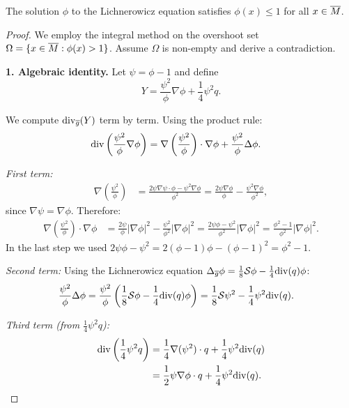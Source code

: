\begin{theorem}\label{thm:PhiBound}
The solution $\phi$ to the Lichnerowicz equation satisfies $\phi(x) \le 1$ for all $x \in \overline{M}$.
\end{theorem}
\begin{proof}
We employ the integral method on the overshoot set $\Omega = \{ x \in \overline{M} : \phi(x) > 1 \}$. Assume $\Omega$ is non-empty and derive a contradiction.

\textbf{1. Algebraic identity.}
Let $\psi = \phi-1$ and define
\[ Y = \frac{\psi^2}{\phi}\nabla \phi + \frac{1}{4}\psi^2 q. \]

We compute $\mathrm{div}_{\overline{g}}(Y)$ term by term. Using the product rule:
\begin{align*}
    \mathrm{div}\left(\frac{\psi^2}{\phi}\nabla \phi\right) &= \nabla\left(\frac{\psi^2}{\phi}\right) \cdot \nabla \phi + \frac{\psi^2}{\phi} \Delta \phi.
\end{align*}

\textit{First term:}
\begin{align*}
    \nabla\left(\frac{\psi^2}{\phi}\right) &= \frac{2\psi \nabla\psi \cdot \phi - \psi^2 \nabla\phi}{\phi^2} = \frac{2\psi \nabla\phi}{\phi} - \frac{\psi^2 \nabla\phi}{\phi^2},
\end{align*}
since $\nabla\psi = \nabla\phi$. Therefore:
\begin{align*}
    \nabla\left(\frac{\psi^2}{\phi}\right) \cdot \nabla\phi &= \frac{2\psi}{\phi}|\nabla\phi|^2 - \frac{\psi^2}{\phi^2}|\nabla\phi|^2 = \frac{2\psi\phi - \psi^2}{\phi^2}|\nabla\phi|^2 = \frac{\phi^2 - 1}{\phi^2}|\nabla\phi|^2.
\end{align*}
In the last step we used $2\psi\phi - \psi^2 = 2(\phi-1)\phi - (\phi-1)^2 = \phi^2 - 1$.

\textit{Second term:}
Using the Lichnerowicz equation $\Delta_{\overline{g}} \phi = \tfrac18 \mathcal{S}\phi - \tfrac14 \mathrm{div}(q)\phi$:
\begin{align*}
    \frac{\psi^2}{\phi}\Delta\phi &= \frac{\psi^2}{\phi}\left(\frac{1}{8}\mathcal{S}\phi - \frac{1}{4}\mathrm{div}(q)\phi\right) = \frac{1}{8}\mathcal{S}\psi^2 - \frac{1}{4}\psi^2\mathrm{div}(q).
\end{align*}

\textit{Third term (from $\frac{1}{4}\psi^2 q$):}
\begin{align*}
    \mathrm{div}\left(\frac{1}{4}\psi^2 q\right) &= \frac{1}{4}\nabla(\psi^2) \cdot q + \frac{1}{4}\psi^2 \mathrm{div}(q) \\
    &= \frac{1}{2}\psi \nabla\phi \cdot q + \frac{1}{4}\psi^2 \mathrm{div}(q).
\end{align*}


\end{proof}
